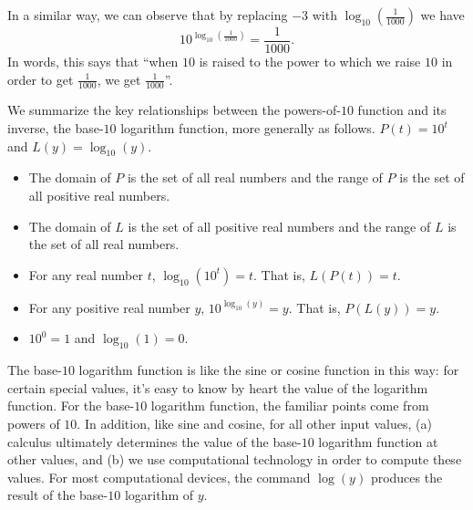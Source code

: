 \documentclass[nooutcomes]{ximera}
\begin{document}
In a similar way, we can observe that by replacing \(-3\) with \(\log_{10}\left(\frac{1}{1000}\right)\) we have%
\begin{equation*}
10^{\log_{10}(\frac{1}{1000})} = \frac{1}{1000}\text{.}\label{eq-exp-log-base-10-minus-3-undo}
\end{equation*}
In words, this says that ``when \(10\) is raised to the power to which we raise \(10\) in order to get \(\frac{1}{1000}\), we get \(\frac{1}{1000}\)''.%

We summarize the key relationships between the powers-of-\(10\) function and its inverse, the base-\(10\) logarithm function, more generally as follows.%
{\(P(t) = 10^t\) and \(L(y) = \log_{10}(y)\).}
\begin{itemize}[label=\textbullet]
\item
The domain of \(P\) is the set of all real numbers and the range of \(P\) is the set of all positive real numbers.%
\item
The domain of \(L\) is the set of all positive real numbers and the range of \(L\) is the set of all real numbers.%
\item
For any real number \(t\), \(\log_{10}(10^t) = t\).  That is, \(L(P(t)) = t\).%
\item
For any positive real number \(y\), \(10^{\log_{10}(y)} = y\).  That is, \(P(L(y)) = y\).%
\item
\(10^0 = 1\) and \(\log_{10}(1) = 0\).%
\end{itemize}

The base-\(10\) logarithm function is like the sine or cosine function in this way:  for certain special values, it's easy to know by heart the value of the logarithm function.  
For the base-\(10\) logarithm function, the familiar points come from powers of \(10\). In addition, like sine and cosine, for all other input values, (a) calculus ultimately determines the value of the base-\(10\) logarithm function at other values, and (b) we use computational technology in order to compute these values.  For most computational devices, the command $\log(y)$ produces the result of the base-\(10\) logarithm of \(y\).%
\end{document}
